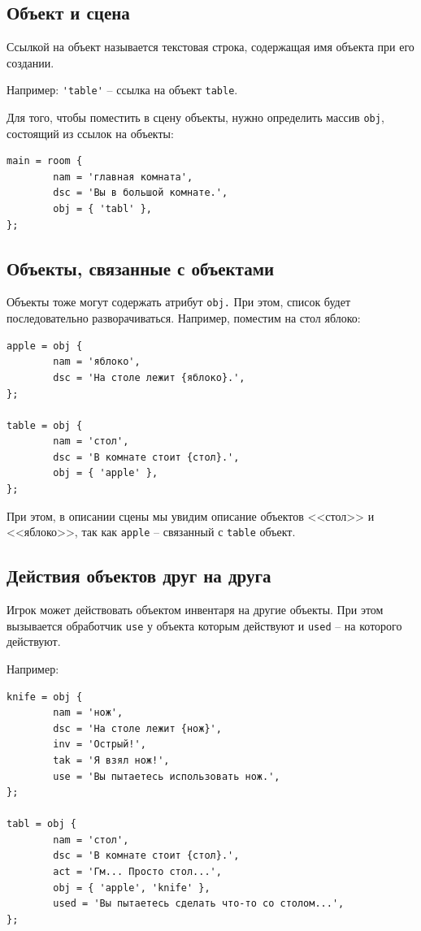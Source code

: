\documentclass[a4paper,12pt]{article}
\begin{document}
\subsection{Объект и сцена}

Ссылкой на объект называется текстовая строка, содержащая имя объекта при его создании.

Например: \verb/'table'/ -- ссылка на объект \verb/table/.

Для того, чтобы поместить в сцену объекты, нужно определить массив \verb/obj/, состоящий из ссылок на объекты:

\begin{verbatim}
main = room {
        nam = 'главная комната',
        dsc = 'Вы в большой комнате.',
        obj = { 'tabl' },
};
\end{verbatim}

\subsection{Объекты, связанные с объектами}


Объекты тоже могут содержать атрибут \verb/obj./ При этом, список будет последовательно разворачиваться. Например, поместим на стол яблоко:

\begin{verbatim}
apple = obj {
        nam = 'яблоко',
        dsc = 'На столе лежит {яблоко}.',
};

table = obj {
        nam = 'стол',
        dsc = 'В комнате стоит {стол}.',
        obj = { 'apple' },
};
\end{verbatim}

При этом, в описании сцены мы увидим описание объектов <<стол>> и <<яблоко>>, так как \verb/apple/ -- связанный с \verb/table/ объект.

\subsection{Действия объектов друг на друга}

Игрок может действовать объектом инвентаря на другие объекты. При этом вызывается обработчик \verb/use/ у объекта которым действуют и \verb/used/ -- на которого действуют.

Например:

\begin{verbatim}
knife = obj {
        nam = 'нож',
        dsc = 'На столе лежит {нож}',
        inv = 'Острый!',
        tak = 'Я взял нож!',
        use = 'Вы пытаетесь использовать нож.',
};

tabl = obj {
        nam = 'стол',
        dsc = 'В комнате стоит {стол}.',
        act = 'Гм... Просто стол...',
        obj = { 'apple', 'knife' },
        used = 'Вы пытаетесь сделать что-то со столом...',
};
\end{verbatim}
\end{document}
